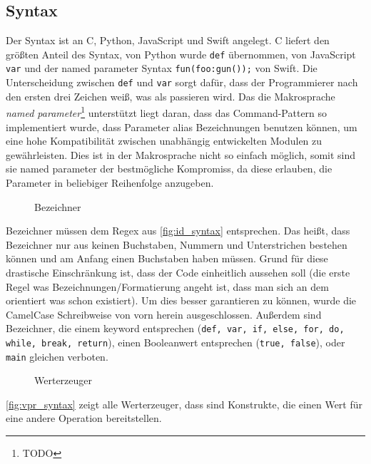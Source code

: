   \subsection{Syntax}
  \label{ssec:Syntax}
    Der Syntax ist an C, Python, JavaScript und Swift angelegt. C liefert den größten Anteil des Syntax, von Python wurde \lstinline[style=MyMacroStyle]$def$ übernommen, von JavaScript \lstinline[style=MyMacroStyle]$var$ und der named parameter Syntax \lstinline[style=MyMacroStyle]$fun(foo:gun());$ von Swift. Die Unterscheidung zwischen \lstinline[style=MyMacroStyle]$def$ und \lstinline[style=MyMacroStyle]$var$ sorgt dafür, dass der Programmierer nach den ersten drei Zeichen weiß, was als passieren wird. Das die Makrosprache \emph{named parameter}\footnote{
      TODO %
    } unterstützt liegt daran, dass das Command-Pattern so implementiert wurde, dass Parameter alias Bezeichnungen benutzen können, um eine hohe Kompatibilität zwischen unabhängig entwickelten Modulen zu gewährleisten. Dies ist in der Makrosprache nicht so einfach möglich, somit sind sie named parameter der bestmögliche Kompromiss, da diese erlauben, die Parameter in beliebiger Reihenfolge anzugeben.

    \begin{figure}[H]
      \centering
      
      \caption{Bezeichner}
      \label{fig:id_syntax}
    \end{figure}
    Bezeichner müssen dem Regex aus \autoref{fig:id_syntax} entsprechen. Das heißt, dass Bezeichner nur aus keinen Buchstaben, Nummern und Unterstrichen bestehen können und am Anfang einen Buchstaben haben müssen. Grund für diese drastische Einschränkung ist, dass der Code einheitlich aussehen soll (die erste Regel was Bezeichnungen/Formatierung angeht ist, dass man sich an dem orientiert was schon existiert). Um dies besser garantieren zu können, wurde die CamelCase Schreibweise von vorn herein ausgeschlossen. Außerdem sind Bezeichner, die einem keyword entsprechen (\lstinline[style=MyMacroStyle]$def, var, if, else, for, do, while, break, return$), einen Booleanwert entsprechen (\lstinline[style=MyMacroStyle]$true, false$), oder \lstinline[style=MyMacroStyle]$main$ gleichen verboten.

    \begin{figure}[H]
      \centering
      
      \caption{Werterzeuger}
      \label{fig:vpr_syntax}
    \end{figure}
    \autoref{fig:vpr_syntax} zeigt alle Werterzeuger, dass sind Konstrukte, die einen Wert für eine andere Operation bereitstellen.

